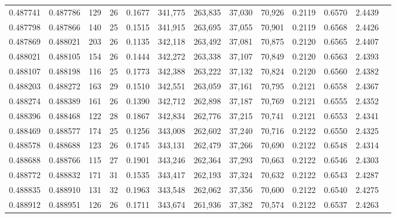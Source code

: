 \begin{tabular}{rrrrrrrrrrrrr}
0.487741 & 0.487786 & 129 &  26 &                                     0.1677 & 341,775 & 263,835 &  37,030 &  70,926 & 0.2119 & 0.6570 & 2.4439 \\
0.487798 & 0.487866 & 140 &  25 &                                     0.1515 & 341,915 & 263,695 &  37,055 &  70,901 & 0.2119 & 0.6568 & 2.4426 \\
0.487869 & 0.488021 & 203 &  26 &                                     0.1135 & 342,118 & 263,492 &  37,081 &  70,875 & 0.2120 & 0.6565 & 2.4407 \\
0.488021 & 0.488105 & 154 &  26 &                                     0.1444 & 342,272 & 263,338 &  37,107 &  70,849 & 0.2120 & 0.6563 & 2.4393 \\
0.488107 & 0.488198 & 116 &  25 &                                     0.1773 & 342,388 & 263,222 &  37,132 &  70,824 & 0.2120 & 0.6560 & 2.4382 \\
0.488203 & 0.488272 & 163 &  29 &                                     0.1510 & 342,551 & 263,059 &  37,161 &  70,795 & 0.2121 & 0.6558 & 2.4367 \\
0.488274 & 0.488389 & 161 &  26 &                                     0.1390 & 342,712 & 262,898 &  37,187 &  70,769 & 0.2121 & 0.6555 & 2.4352 \\
0.488396 & 0.488468 & 122 &  28 &                                     0.1867 & 342,834 & 262,776 &  37,215 &  70,741 & 0.2121 & 0.6553 & 2.4341 \\
0.488469 & 0.488577 & 174 &  25 &                                     0.1256 & 343,008 & 262,602 &  37,240 &  70,716 & 0.2122 & 0.6550 & 2.4325 \\
0.488578 & 0.488688 & 123 &  26 &                                     0.1745 & 343,131 & 262,479 &  37,266 &  70,690 & 0.2122 & 0.6548 & 2.4314 \\
0.488688 & 0.488766 & 115 &  27 &                                     0.1901 & 343,246 & 262,364 &  37,293 &  70,663 & 0.2122 & 0.6546 & 2.4303 \\
0.488772 & 0.488832 & 171 &  31 &                                     0.1535 & 343,417 & 262,193 &  37,324 &  70,632 & 0.2122 & 0.6543 & 2.4287 \\
0.488835 & 0.488910 & 131 &  32 &                                     0.1963 & 343,548 & 262,062 &  37,356 &  70,600 & 0.2122 & 0.6540 & 2.4275 \\
0.488912 & 0.488951 & 126 &  26 &                                     0.1711 & 343,674 & 261,936 &  37,382 &  70,574 & 0.2122 & 0.6537 & 2.4263 \\

\end{tabular}
